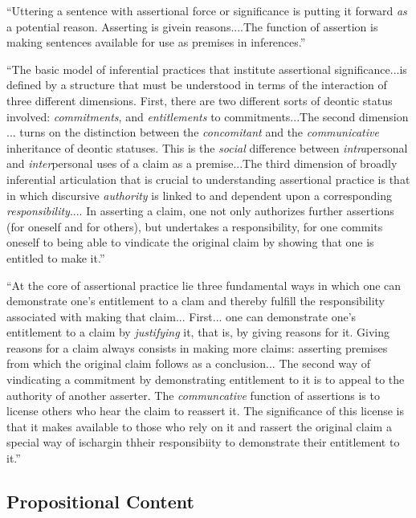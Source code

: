 ``Uttering a sentence with assertional force or significance is
putting it forward \textit{as} a potential reason.  Asserting is
givein reasons....The function of assertion is making sentences
available for use as premises in inferences.'' \citep[168]{brandom_making_1998}

``The basic model of inferential practices that institute assertional
significance...is defined by a structure that must be understood in
terms of the interaction of three different dimensions.  First, there
are two different sorts of deontic status involved:
\textit{commitments}, and \textit{entitlements} to commitments...The
second dimension ... turns on the distinction between the
\textit{concomitant} and the \textit{communicative} inheritance of
deontic statuses.  This is the \textit{social} difference between
\textit{intra}personal and \textit{inter}personal uses of a claim as a
premise...The third dimension of broadly inferential articulation
that is crucial to understanding assertional practice is that in which
discursive \textit{authority} is linked to and dependent upon a
corresponding \textit{responsibility}.... In asserting a claim, one
not only authorizes further assertions (for oneself and for others),
but undertakes a responsibility, for one commits oneself to being able
to vindicate the original claim by showing that one is entitled to
make it.''\citep[168-171]{brandom_making_1998}

``At the core of assertional practice lie three fundamental ways in
which one can demonstrate one's entitlement to a clam and thereby
fulfill the responsibility associated with making that
claim... First... one can demonstrate one's entitlement to a claim by
\textit{justifying} it, that is, by giving reasons for it.  Giving
reasons for a claim always consists in making more claims: asserting
premises from which the original claim follows as a conclusion... The
second way of vindicating a commitment by demonstrating entitlement to
it is to appeal to the authority of another asserter.  The
\textit{communcative} function of assertions is to license others who
hear the claim to reassert it.  The significance of this license is
that it makes available to those who rely on it and rassert the
original claim a special way of ischargin thheir responsibiity to
demonstrate their entitlement to it.''\citep[174; the third way
involves invoking one's own authority as a reliable noninferential
reporter, which is discussed later in MIE.]{brandom_making_1998}

\subsection{Propositional Content}
\label{subs:}

